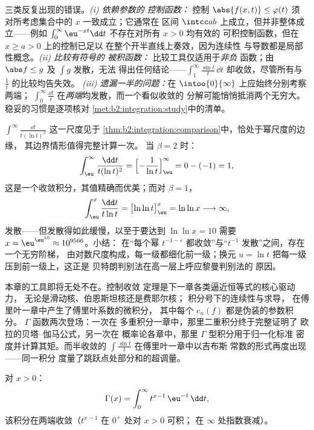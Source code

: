 \begin{remark}[常见陷阱]
三类反复出现的错误。\emph{(i) 依赖参数的
控制函数：} 控制 $\abs{f(x,t)} \leq \varphi(t)$ 须
对所考虑集合中的 $x$ 一致成立；它通常在
区间 $\intcc ab$ 上成立，但并非整体成立——例如
$\int_0^\infty\eu^{-xt}\dd t$ 不存在对所有 $x > 0$ 均有效的
可积控制函数，但在 $x \geq a > 0$ 上的控制已足以
在整个开半直线上奏效，因为连续性
与导数都是局部性概念。\emph{(ii) 比较有符号的
被积函数：} 比较工具仅适用于\emph{非负}
函数；由 $\abs f \leq g$ 及 $\int g$ 发散，无法
得出任何结论——$\int_1^\infty\frac{\sin t}t\,\dd t$
却收敛，尽管所有与 $\frac1t$ 的比较均告失效。
\emph{(iii) 遗漏一半的问题：}在
$\intoo{0}{\infty}$ 上应始终分别考察两端；
$\int_0^\infty\frac{\dd t}{t}$ 在\emph{两端}均发散，而一个看似收敛的
分解可能悄悄抵消两个无穷大。
稳妥的习惯是逐项核对
\cref{met:b2:integration:study}中的清单。
\end{remark}

\begin{example}\label{ex:b2:integration:bertrandboundary}
$\int^\infty\frac{\dd t}{t(\ln t)^\beta}$ 这一尺度见于
\cref{thm:b2:integration:comparison}中，恰处于幂尺度的边缘，
其边界情形值得完整计算一次。
当 $\beta = 2$ 时：
\[
\int_\eu^{\infty}\frac{\dd t}{t(\ln t)^2}
= \Bigl[-\frac{1}{\ln t}\Bigr]_\eu^{\infty}
= 0 - (-1) = 1 ,
\]
这是一个收敛积分，其值精确而优美；而对
$\beta = 1$，
\[
\int_\eu^{x}\frac{\dd t}{t\ln t}
= \bigl[\ln\ln t\bigr]_\eu^{x} = \ln\ln x
\longrightarrow \infty ,
\]
发散——但发散得如此缓慢，以至于要达到 $\ln\ln x = 10$
需要 $x = \eu^{\eu^{10}} \approx 10^{9566}$。小结：
在“每个幂 $t^{-1-\varepsilon}$
都收敛”与“$t^{-1}$ 发散”之间，存在一个无穷阶梯，
由对数尺度构成，每一级都细化前一级；换元
$u = \ln t$ 把每一级压到前一级上，这正是
贝特朗判别法在高一层上呼应黎曼判别法的
原因。
\end{example}

\begin{remark}[本分册的展望]
本章的工具即将无处不在。控制收敛
定理是下一章各类逼近恒等式的核心驱动力，
无论是滑动核、伯恩斯坦核还是费耶尔核；
积分号下的连续性与求导，
在傅里叶一章中产生了傅里叶系数的微积分，
其中每个 $c_n(f)$ 都是伪装的参数积分。
$\Gamma$ 函数两次登场：一次在
多重积分一章中，那里二重积分终于完整证明了
欧拉的贝塔–伽马公式，另一次在
概率论各章中，那里 $\Gamma$ 型积分用于归一化标准
密度并计算其矩。而半收敛的
$\int\frac{\sin t}{t}$ 在傅里叶一章中以吉布斯
常数的形式再度出现——同一积分
度量了跳跃点处部分和的超调量。
\end{remark}

\begin{definition}[$\Gamma$ 函数]\label{def:b2:integration:gamma}
对 $x > 0$：
\[
\Gamma(x) = \int_0^{\infty} t^{x-1}\,\eu^{-t}\,\dd t ,
\]
该积分在两端收敛（$t^{x-1}$ 在 $0^+$ 处对 $x > 0$ 可积；
在 $\infty$ 处指数衰减）。
\end{definition}

